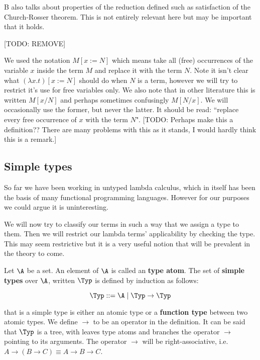 \begin{remark}
B also talks about properties of the reduction defined such as satisfaction of the Church-Rosser theorem. This is not entirely relevant here but may be important that it holds.
\end{remark}

[TODO: REMOVE]
\begin{remark} 
    We used the notation $M[x:= N]$ which means take all (free) occurrences of the variable $x$ inside the term $M$ and replace it with the term $N$. Note it isn't clear what $(\lambda x . t)[x := N]$ should do when $N$ is a term, however we will try to restrict it's use for free variables only. We also note that in other literature this is written $M[x/N]$ and perhaps sometimes confusingly $M[N/x]$. We will occasionally use the former, but never the latter. It should be read: ``replace every free occurrence of $x$ with the term $N$". [TODO: Perhaps make this a definition?? There are many problems with this as it stands, I would hardly think this is a remark.]
\end{remark}

\subsection{Simple types}

So far we have been working in untyped lambda calculus, which in itself has been the basis of many functional programming languages. However for our purposes we could argue it is uninteresting.

We will now try to classify our terms in such a way that we assign a type to them. Then we will restrict our lambda terms' applicability by checking the type. This may seem restrictive but it is a very useful notion that will be prevalent in the theory to come.

\begin{defin}

Let $\A$ be a set. An element of $\A$ is called an {\bf type atom}. The set of {\bf simple types} over $\A$, written $\Typ$ is defined by induction as follows:

\[
\Typ ::= \A \mid \Typ \to \Typ
\]

that is a simple type is either an atomic type or a {\bf function type} between two atomic types. We define $\to$ to be an operator in the definition. It can be said that $\Typ$ is a tree, with leaves type atoms and branches the operator $\to$ pointing to its arguments. The operator $\to$ will be right-associative, i.e. $A \to (B \to C)\equiv A \to B \to C$.
\end{defin}


